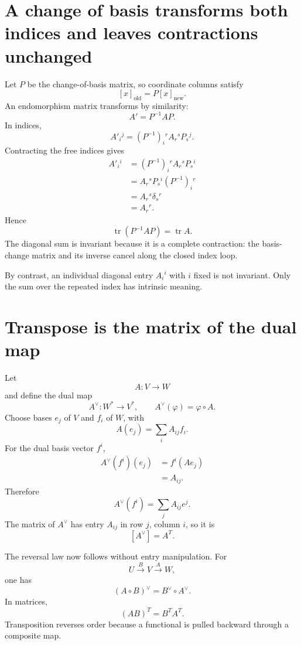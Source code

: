 \section{A change of basis transforms both indices and leaves contractions unchanged}

Let \(P\) be the change-of-basis matrix, so coordinate columns satisfy
\[
  [x]_{\mathrm{old}}=P[x]_{\mathrm{new}}.
\]
An endomorphism matrix transforms by similarity:
\[
  A'=P^{-1}AP.
\]
In indices,
\[
  A'_i{}^{j}
  =(P^{-1})_i{}^{r}
   A_r{}^{s}P_s{}^{j}.
\]
Contracting the free indices gives
\[
\begin{aligned}
  A'_i{}^{i}
  &=(P^{-1})_i{}^{r}
    A_r{}^{s}P_s{}^{i}\\
  &=A_r{}^{s}
    P_s{}^{i}(P^{-1})_i{}^{r}\\
  &=A_r{}^{s}\delta_s{}^{r}\\
  &=A_r{}^{r}.
\end{aligned}
\]
Hence
\[
  \operatorname{tr}(P^{-1}AP)
  =\operatorname{tr}A.
\]
The diagonal sum is invariant because it is a complete contraction: the basis-change matrix and its inverse cancel along the closed index loop.

By contrast, an individual diagonal entry \(A_i{}^i\) with \(i\) fixed is not invariant.  Only the sum over the repeated index has intrinsic meaning.

\section{Transpose is the matrix of the dual map}

Let
\[
  A:V\to W
\]
and define the dual map
\[
  A^\vee:W^*\to V^*,
  \qquad
  A^\vee(\varphi)=\varphi\circ A.
\]
Choose bases \(e_j\) of \(V\) and \(f_i\) of \(W\), with
\[
  A(e_j)=\sum_i A_{ij}f_i.
\]
For the dual basis vector \(f^i\),
\[
\begin{aligned}
  A^\vee(f^i)(e_j)
  &=f^i(Ae_j)\\
  &=A_{ij}.
\end{aligned}
\]
Therefore
\[
  A^\vee(f^i)=\sum_jA_{ij}e^j.
\]
The matrix of \(A^\vee\) has entry \(A_{ij}\) in row \(j\), column \(i\), so it is
\[
  [A^\vee]=A^T.
\]

The reversal law now follows without entry manipulation.  For
\[
  U\xrightarrow{B}V\xrightarrow{A}W,
\]
one has
\[
  (A\circ B)^\vee
  =B^\vee\circ A^\vee.
\]
In matrices,
\[
  (AB)^T=B^TA^T.
\]
Transposition reverses order because a functional is pulled backward through a composite map.

